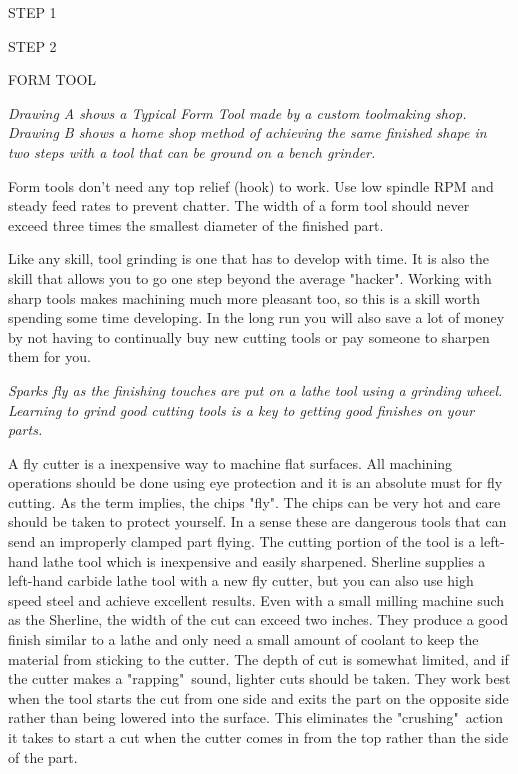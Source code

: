 STEP 1
                     
STEP 2

FORM TOOL
\bigskip

\textit{Drawing A shows a Typical Form Tool made by a custom toolmaking shop.
Drawing B shows a home shop method of achieving the same finished shape in two
steps with a tool that can be ground on a bench grinder.}
\bigskip

Form tools don't need any top relief (hook) to work. Use low spindle RPM and
steady feed rates to prevent chatter. The width of a form tool should never
exceed three times the smallest diameter of the finished part.

Like any skill, tool grinding is one that has to develop with time. It is also
the skill that allows you to go one step beyond the average "hacker". Working
with sharp tools makes machining much more pleasant too, so this is a skill
worth spending some time developing. In the long run you will also save a lot of
money by not having to continually buy new cutting tools or pay someone to
sharpen them for you.

\bigskip
\textit{Sparks fly as the finishing touches are put on a lathe tool using a
grinding wheel. Learning to grind good cutting tools is a key to getting good
finishes on your parts.}
\bigskip

\secup

\secdown


A fly cutter is a inexpensive way to machine flat surfaces. All machining
operations should be done using eye protection and it is an absolute must for
fly cutting. As the term implies, the chips "fly". The chips can be very hot and
care should be taken to protect yourself. In a sense these are dangerous tools
that can send an improperly clamped part flying. The cutting portion of the tool
is a left-hand lathe tool which is inexpensive and easily sharpened. Sherline
supplies a left-hand carbide lathe tool with a new fly cutter, but you can also
use high speed steel and achieve excellent results. Even with a small milling
machine such as the Sherline, the width of the cut can exceed two inches. They
produce a good finish similar to a lathe and only need a small amount of coolant
to keep the material from sticking to the cutter. The depth of cut is somewhat
limited, and if the cutter makes a "rapping"\ sound, lighter cuts should be
taken. They work best when the tool starts the cut from one side and exits the
part on the opposite side rather than being lowered into the surface. This
eliminates the "crushing"\ action it takes to start a cut when the cutter comes
in from the top rather than the side of the part.

